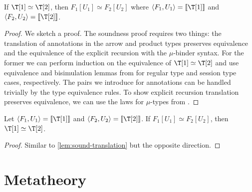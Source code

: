 \begin{lemma}
  If $\T[1] \simeq \T[2]$, then $F_1 [U_1] \simeq F_2 [U_2]$
  where $\langle F_1, U_1 \rangle = \tofreest{\T[1]}$ and
  $\langle F_2, U_2 \rangle = \tofreest{\T[2]}$.
  \label{lem:sound-translation}
\end{lemma}
\begin{proof}
  We sketch a proof. The soundness proof requires two things: the translation of
  annotations in the arrow and product types preserves equivalence and the
  equivalence of the explicit recursion with the $\mu$-binder syntax. For the
  former we can perform induction on the equivalence of $\T[1] \simeq \T[2]$ and
  use equivalence and bisimulation lemmas from \citet{DBLP:conf/icfp/ThiemannV16}
  for regular type and session type cases, respectively. The pairs we introduce
  for annotations can be handled trivially by the type equivalence rules. To
  show explicit recursion translation preserves equivalence, we can use the laws
  for $\mu$-types from \citet{DBLP:conf/icfp/ThiemannV16}. 
\end{proof}

\begin{lemma}
  Let $\langle F_1, U_1 \rangle = \tofreest{\T[1]}$ and
  $\langle F_2, U_2 \rangle = \tofreest{\T[2]}$. If
  $F_1 [U_1] \simeq F_2 [U_2]$, then $\T[1] \simeq \T[2]$.
\end{lemma}
\begin{proof}
  Similar to \ref{lem:sound-translation} but the opposite direction.
\end{proof}

\clearpage

\section{Metatheory}
\label{sec:appendix-metatheory}

